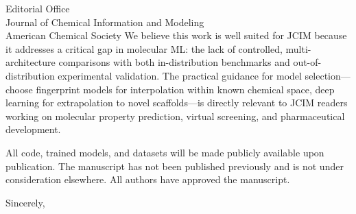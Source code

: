 \documentclass[11pt]{letter}
\begin{document}
\begin{letter}{Editorial Office\\
Journal of Chemical Information and Modeling\\
American Chemical Society}
We believe this work is well suited for JCIM because it addresses a critical gap in molecular ML: the lack of controlled, multi-architecture comparisons with both in-distribution benchmarks and out-of-distribution experimental validation.
The practical guidance for model selection---choose fingerprint models for interpolation within known chemical space, deep learning for extrapolation to novel scaffolds---is directly relevant to JCIM readers working on molecular property prediction, virtual screening, and pharmaceutical development.

All code, trained models, and datasets will be made publicly available upon publication.
The manuscript has not been published previously and is not under consideration elsewhere.
All authors have approved the manuscript.

\closing{Sincerely,}

\end{letter}
\end{document}
